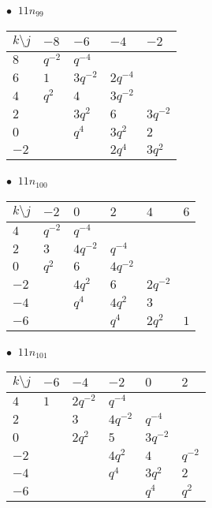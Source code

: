 %
\begin{minipage}{\linewidth}
$\bullet\ $ $11n_{99}$ \vspace{0.5em} \\
\begin{tabular}{l|llll}
$k \setminus j$ & $-8$ & $-6$ & $-4$ & $-2$ \\
\hline
$8$ & $q^{-2}$ & $q^{-4}$ &  &  \\
$6$ & $1$ & $3q^{-2}$ & $2q^{-4}$ &  \\
$4$ & $q^{2}$ & $4$ & $3q^{-2}$ &  \\
$2$ &  & $3q^{2}$ & $6$ & $3q^{-2}$ \\
$0$ &  & $q^{4}$ & $3q^{2}$ & $2$ \\
$-2$ &  &  & $2q^{4}$ & $3q^{2}$ \\
\end{tabular}
\vspace{2em}
\end{minipage}
%
\begin{minipage}{\linewidth}
$\bullet\ $ $11n_{100}$ \vspace{0.5em} \\
\begin{tabular}{l|lllll}
$k \setminus j$ & $-2$ & $0$ & $2$ & $4$ & $6$ \\
\hline
$4$ & $q^{-2}$ & $q^{-4}$ &  &  &  \\
$2$ & $3$ & $4q^{-2}$ & $q^{-4}$ &  &  \\
$0$ & $q^{2}$ & $6$ & $4q^{-2}$ &  &  \\
$-2$ &  & $4q^{2}$ & $6$ & $2q^{-2}$ &  \\
$-4$ &  & $q^{4}$ & $4q^{2}$ & $3$ &  \\
$-6$ &  &  & $q^{4}$ & $2q^{2}$ & $1$ \\
\end{tabular}
\vspace{2em}
\end{minipage}
%
\begin{minipage}{\linewidth}
$\bullet\ $ $11n_{101}$ \vspace{0.5em} \\
\begin{tabular}{l|lllll}
$k \setminus j$ & $-6$ & $-4$ & $-2$ & $0$ & $2$ \\
\hline
$4$ & $1$ & $2q^{-2}$ & $q^{-4}$ &  &  \\
$2$ &  & $3$ & $4q^{-2}$ & $q^{-4}$ &  \\
$0$ &  & $2q^{2}$ & $5$ & $3q^{-2}$ &  \\
$-2$ &  &  & $4q^{2}$ & $4$ & $q^{-2}$ \\
$-4$ &  &  & $q^{4}$ & $3q^{2}$ & $2$ \\
$-6$ &  &  &  & $q^{4}$ & $q^{2}$ \\
\end{tabular}
\vspace{2em}
\end{minipage}

